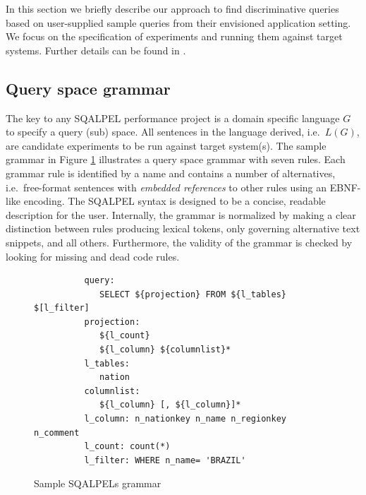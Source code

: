 \documentclass{cidr-2019}
\begin{document}
In this section we briefly describe our approach to find
discriminative queries based on user-supplied sample queries from
their envisioned application setting. We focus on the specification
of experiments and running them against target systems. Further
details can be found in \cite{DBLP:conf/sigmod/KerstenKZ18}.

\subsection{Query space grammar}\label{specification}
The key to any {\sc SQALPEL} performance project is a domain specific
language $G$ to specify a query (sub) space. All sentences in the
language derived, i.e.\ $L(G)$, are candidate experiments to be run
against target system(s). The sample grammar in Figure
\ref{fig:script1} illustrates a query space grammar with seven rules.
Each grammar rule is identified by a name and contains a number of
alternatives, i.e.\ free-format sentences with \textit{embedded
  references} to other rules using an EBNF-like encoding.
The {\sc SQALPEL} syntax is designed to be a concise, readable
description for the user. Internally, the grammar is normalized by
making a clear distinction between rules producing lexical tokens,
only governing alternative text snippets, and all others.
Furthermore, the validity of the grammar is checked by looking for
missing and dead code rules.

\begin{figure}[t]
	\begin{verbatim}
          query:
             SELECT ${projection} FROM ${l_tables} $[l_filter]
          projection:
             ${l_count}
             ${l_column} ${columnlist}*
          l_tables:
             nation
          columnlist:
             ${l_column} [, ${l_column}]*
          l_column: n_nationkey n_name n_regionkey n_comment
          l_count: count(*)
          l_filter: WHERE n_name= 'BRAZIL'
\end{verbatim}
	\caption{Sample {\sc SQALPELs} grammar \label{fig:script1}}
\end{figure}
\end{document}
